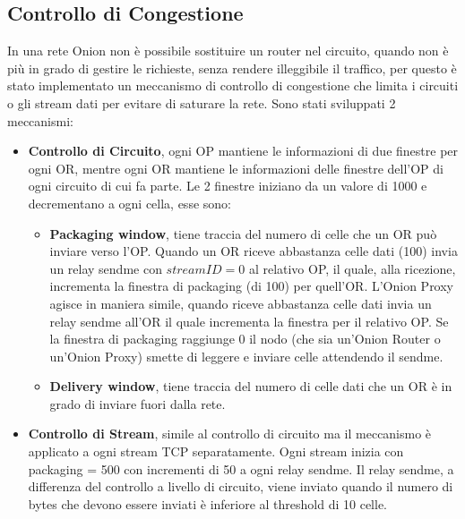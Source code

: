 \subsection{Controllo di Congestione} \label{sec:CongestionControl}
In una rete Onion non è possibile sostituire un router nel circuito, quando non è più in grado di gestire le richieste, senza rendere illeggibile il traffico, per questo è stato implementato un meccanismo di controllo di congestione che limita i circuiti o gli stream dati per evitare di saturare la rete. Sono stati sviluppati 2 meccanismi:
\begin{itemize}
    \item \textbf{Controllo di Circuito}, ogni OP mantiene le informazioni di due finestre per ogni OR, mentre ogni OR mantiene le informazioni delle finestre dell'OP di ogni circuito di cui fa parte. 
    Le 2 finestre iniziano da un valore di 1000 e decrementano a ogni cella, esse sono:
    \begin{itemize}
        \item \textbf{Packaging window}, tiene traccia del numero di celle che un OR può inviare verso l'OP. 
        Quando un OR riceve abbastanza celle dati (100) invia un relay sendme con $streamID = 0$ al relativo OP, il quale, alla ricezione, incrementa la finestra di packaging (di 100) per quell'OR. 
        L'Onion Proxy agisce in maniera simile, quando riceve abbastanza celle dati invia un relay sendme all'OR il quale incrementa la finestra per il relativo OP.
        Se la finestra di packaging raggiunge 0 il nodo (che sia un'Onion Router o un'Onion Proxy) smette di leggere e inviare celle attendendo il sendme. 
        \item \textbf{Delivery window}, tiene traccia del numero di celle dati che un OR è in grado di inviare fuori dalla rete.
    \end{itemize}
    \item \textbf{Controllo di Stream}, simile al controllo di circuito ma il meccanismo è applicato a ogni stream TCP separatamente. Ogni stream inizia con packaging = 500 con incrementi di 50 a ogni relay sendme. Il relay sendme, a differenza del controllo a livello di circuito, viene inviato quando il numero di bytes che devono essere inviati è inferiore al threshold di 10 celle.
\end{itemize}
\cite{onionv2}
